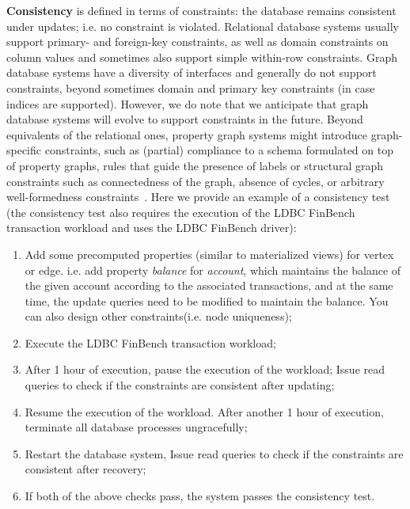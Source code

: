 {\bf Consistency} is defined in terms of constraints: the database remains 
consistent under updates; i.e. no constraint is violated. Relational database 
systems usually support primary- and foreign-key constraints, as well as domain 
constraints on column values and sometimes also support simple within-row 
constraints. Graph database systems have a diversity of interfaces and generally
do not support constraints, beyond sometimes domain and primary key constraints 
(in case indices are supported). However, we do note that we anticipate that 
graph database systems will evolve to support constraints in the future. Beyond 
equivalents of the relational ones, property graph systems might introduce 
graph-specific constraints, such as (partial) compliance to a schema formulated 
on top of property graphs, rules that guide the presence of labels or structural
graph constraints such as connectedness of the graph, absence of cycles, or 
arbitrary well-formedness constraints~\cite{DBLP:journals/sosym/SemerathBHSV17}.
Here we provide an example of a consistency test (the consistency test also 
requires the execution of the LDBC FinBench transaction workload and uses the 
LDBC FinBench driver):

\begin{enumerate}[label={(\roman*)}]
  \item Add some precomputed properties (similar to materialized views) for vertex
        or edge. i.e. add property \emph{balance} for \emph{account}, which 
        maintains the balance of the given account according to the associated 
        transactions, and at the same time, the update queries need to be modified
        to maintain the balance. You can also design other constraints(i.e. node 
        uniqueness);
  \item Execute the LDBC FinBench transaction workload;
  \item After 1 hour of execution, pause the execution of the workload;
        Issue read queries to check if the constraints are consistent after 
        updating;
  \item Resume the execution of the workload. After another 1 hour of execution,
        terminate all database processes ungracefully;
  \item Restart the database system, Issue read queries to check if the 
        constraints are consistent after recovery;
  \item If both of the above checks pass, the system passes the 
        consistency test.
\end{enumerate}
